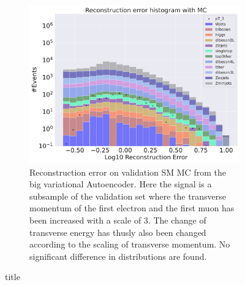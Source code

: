 \begin{figure}[h!]
\begin{subfigure}{.45\textwidth}
        \includegraphics[width=\textwidth]{Figures/VAE_testing/big/b_data_recon_big_rm3_feats_sig_pT_3.pdf}
        \caption{Reconstruction error on validation SM MC from the big variational Autoencoder. Here the signal is a subsample of the validation 
        set where the transverse momentum of the first electron and the first muon has been increased with a scale of $3$. The change of transverse 
        energy has thusly also been changed according to the scaling of transverse momentum. No significant difference in distributions are found. }
        \label{fig:VAE_big_pt_3}
    \end{subfigure}
    \hfill 
    \caption{title}
    \label{fig:VAE_big_small_pt_3}
\end{figure}

